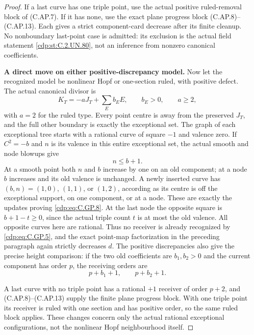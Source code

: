 \begin{proof}
If a last curve has one triple point, use the
actual positive ruled-removal block of (C.AP.7).
If it has none, use the exact plane progress
block (C.AP.8)--(C.AP.13). Each gives a strict
component-card decrease after its finite cleanup.
No nonboundary last-point case is admitted: its
exclusion is the actual field statement \ref{cdp:st:C.2.UN.80},
not an inference from nonzero canonical coefficients.

\par\medskip\noindent\textbf{A direct move on either positive-discrepancy model.}
Now let the recognized model be nonlinear Hopf
or one-section ruled, with positive defect.
The actual canonical divisor is
\[
 K_T=-aJ_T+\sum_E b_EE,
 \qquad b_E>0,
 \qquad a\ge2,
 \tag{C.GP.7}\label{cdp:eq:C.GP.7}
\]
with \(a=2\) for the ruled type. Every point
centre is away from the preserved \(J_T\),
and the full other boundary is exactly the
exceptional set. The graph of each exceptional
tree starts with a rational curve of square
\(-1\) and valence zero. If \(C^2=-b\) and
\(n\) is its valence in this entire exceptional
set, the actual smooth and node blowups give
\[
                              n\le b+1.
 \tag{C.GP.8}\label{cdp:eq:C.GP.8}
\]
At a smooth point both \(n\) and \(b\) increase
by one on an old component; at a node \(b\)
increases and its old valence is unchanged.
A newly inserted curve has \((b,n)=(1,0)\),
\((1,1)\), or \((1,2)\), according as its
centre is off the exceptional support, on
one component, or at a node. These are
exactly the updates proving \eqref{cdp:eq:C.GP.8}.
At the last node the opposite
square is \(b+1-t\ge0\), since the actual
triple count \(t\) is at most the old valence.
All opposite curves here are rational.
Thus no receiver is already recognized by
\eqref{cdp:eq:C.GP.5}, and the exact point-map factorization
in the preceding paragraph again strictly
decreases \(d\). The positive discrepancies
also give the precise height comparison:
if the two old coefficients are \(b_1,b_2>0\)
and the current component has order \(p\),
the receiving orders are
\[
                 p+b_1+1,\qquad p+b_2+1.
 \tag{C.GP.9}\label{cdp:eq:C.GP.9}
\]

A last curve with no triple point has a
rational \(+1\) receiver of order \(p+2\),
and (C.AP.8)--(C.AP.13) supply the finite
plane progress block. With one triple point
its receiver is ruled with one section and
has positive order, so the same ruled block
applies. These changes concern only the
actual rational exceptional configurations,
not the nonlinear Hopf neighbourhood itself.


\end{proof}
